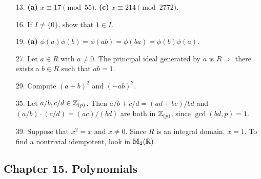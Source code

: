 {\begin{itemize}
\bf\item[13.]\rm
{\bf (a)} $x \equiv 17 \pmod{55}$. {\bf (c)} $x \equiv 214 \pmod{2772}$.
 
 
\bf\item[16.]\rm
If $I \neq \{ 0 \}$, show that $1 \in I$.
 
\bf\item[19.]\rm
{\bf (a)} $\phi(a) \phi(b) = \phi(ab) = \phi(ba) = \phi(b) \phi(a)$.
 
\bf\item[27.]\rm 
Let $a \in R$ with $a \neq 0$. The principal ideal generated by $a$ is $R
\Rightarrow$ there exists a $b \in R$ such that $ab =1$.
 
 
\bf\item[29.]\rm
Compute $(a+b)^2$ and $(-ab)^2$.
 
 
\bf\item[35.]\rm
Let $a/b, c/d \in {\Bbb Z}_{(p)}$. Then \mbox{$a/b + c/d = (ad +
bc)/bd$} and $(a/b) \cdot (c/d) = (ac)/(bd)$ are both in ${\Bbb
Z}_{(p)}$, since $\gcd(bd,p)=1$.  

 
\bf \item[39.]\rm
Suppose that $x^2 = x$ and $x \neq 0$. Since $R$ is an integral
domain, $x = 1$. To find a nontrivial idempotent, look in ${\Bbb
M}_2({\Bbb R})$.
 
 
 
\end{itemize}
}
 
\subsection*{Chapter 15. Polynomials}
 
